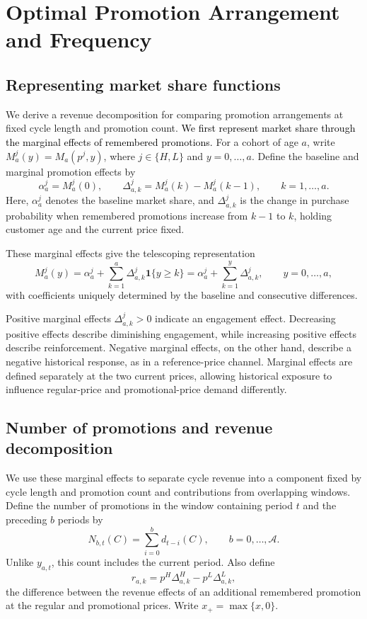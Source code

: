 \section{Optimal Promotion Arrangement and Frequency}
\label{sec:general-decomposition}

\subsection{Representing market share functions}
\label{sec:newton-representation}

We derive a revenue decomposition for comparing promotion arrangements at fixed cycle length and promotion count. \textcolor{black}{We first represent market share through the marginal effects of remembered promotions.} For a cohort of age \(a\), write \(M_a^j(y)=M_a(p^j,y)\), where \(j\in\{H,L\}\) and \(y=0,\ldots,a\). Define the baseline and marginal promotion effects by
\[
 \alpha_a^j=M_a^j(0),\qquad
 \Delta_{a,k}^j=M_a^j(k)-M_a^j(k-1),\qquad k=1,\ldots,a.
\]
Here, \(\alpha_a^j\) denotes the baseline market share, and \(\Delta_{a,k}^j\) is the change in purchase probability when remembered promotions increase from \(k-1\) to \(k\), holding customer age and the current price fixed.

\begingroup\color{black}
These marginal effects give the telescoping representation
\[
 M_a^j(y)=\alpha_a^j+\sum_{k=1}^{a}\Delta_{a,k}^j\mathbf1\{y\ge k\}
         =\alpha_a^j+\sum_{k=1}^{y}\Delta_{a,k}^j,
 \qquad y=0,\ldots,a,
\]
with coefficients uniquely determined by the baseline and consecutive differences.
\par\endgroup

Positive marginal effects \(\Delta_{a,k}^j > 0\) indicate an engagement effect. Decreasing positive effects describe diminishing engagement, while increasing positive effects describe reinforcement. Negative marginal effects, on the other hand, describe a negative historical response, as in a reference-price channel. Marginal effects are defined separately at the two current prices, allowing historical exposure to influence regular-price and promotional-price demand differently.

\subsection{Number of promotions and revenue decomposition}
\label{sec:exposure-decomposition}

\begingroup\color{black}
We use these marginal effects to separate cycle revenue into a component fixed by cycle length and promotion count and contributions from overlapping windows. Define the number of promotions in the window containing period \(t\) and the preceding \(b\) periods by
\[
 N_{b,t}(C)=\sum_{i=0}^{b}d_{t-i}(C),\qquad b=0,\ldots,\mathcal A.
\]
Unlike \(y_{a,t}\), this count includes the current period. Also define
\[
 r_{a,k}=p^H\Delta_{a,k}^H-p^L\Delta_{a,k}^L,
\]
the difference between the revenue effects of an additional remembered promotion at the regular and promotional prices. Write \(x_+=\max\{x,0\}\).
\par\endgroup

